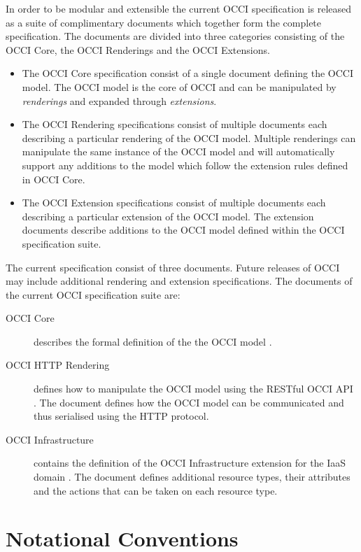 \documentclass[10pt,a4paper]{article}
\begin{document}
In order to be modular and extensible the current OCCI specification is
released as a suite of complimentary documents which together form the complete
specification.
%
The documents are divided into three categories consisting of the OCCI Core,
the OCCI Renderings and the OCCI Extensions.
%
\begin{itemize}
\item The OCCI Core specification consist of a single document defining the
 OCCI model. The OCCI model is the core of OCCI and can be manipulated by {\em
 renderings} and expanded through {\em extensions}.
\item The OCCI Rendering specifications consist of multiple documents each
 describing a particular rendering of the OCCI model. Multiple renderings can
 manipulate the same instance of the OCCI model and will automatically support
 any additions to the model which follow the extension rules defined in OCCI
 Core.
\item The OCCI Extension specifications consist of multiple documents each
 describing a particular extension of the OCCI model. The extension documents
 describe additions to the OCCI model defined within the OCCI specification
 suite.
\end{itemize}
%
The current specification consist of three documents.
Future releases of OCCI may include additional rendering and extension
specifications. The documents of the current OCCI specification suite are:

\begin{description}
\item[OCCI Core] describes the formal definition of the the OCCI model
\cite{occi:core}.
\item[OCCI HTTP Rendering] defines how to manipulate the OCCI model using the
RESTful OCCI API \cite{occi:http_rendering}. The document defines how the OCCI model can
be communicated and thus serialised using the HTTP protocol.
\item[OCCI Infrastructure] contains the definition of the OCCI Infrastructure
extension for the IaaS domain \cite{occi:infrastructure}. The document defines
additional resource types, their attributes and the actions that can be taken
on each resource type.
\end{description}


\section{Notational Conventions}

\end{document}
